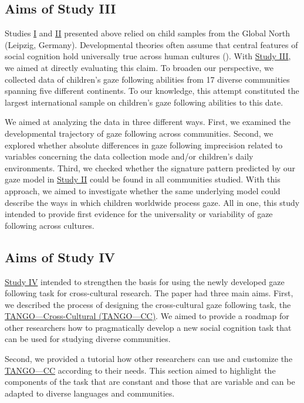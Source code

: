 \documentclass[
]{scrbook}
\begin{document}
\subsection{Aims of Study III}\label{aimsIII}

Studies \hyperref[studyI]{I} and \hyperref[studyII]{II} presented above relied on child samples from the Global North (Leipzig, Germany). Developmental theories often assume that central features of social cognition hold universally true across human cultures (). With \hyperref[studyIII]{Study III}, we aimed at directly evaluating this claim. To broaden our perspective, we collected data of children's gaze following abilities from 17 diverse communities spanning five different continents. To our knowledge, this attempt constituted the largest international sample on children's gaze following abilities to this date.

We aimed at analyzing the data in three different ways. First, we examined the developmental trajectory of gaze following across communities. Second, we explored whether absolute differences in gaze following imprecision related to variables concerning the data collection mode and/or children's daily environments. Third, we checked whether the signature pattern predicted by our gaze model in \hyperref[studyII]{Study II} could be found in all communities studied. With this approach, we aimed to investigate whether the same underlying model could describe the ways in which children worldwide process gaze. All in one, this study intended to provide first evidence for the universality or variability of gaze following across cultures.

\subsection{Aims of Study IV}\label{aimsIV}

\hyperref[studyIV]{Study IV} intended to strengthen the basis for using the newly developed gaze following task for cross-cultural research. The paper had three main aims. First, we described the process of designing the cross-cultural gaze following task, the \hyperref[acronyms_TANGOux2014CC]{TANGO---Cross-Cultural (TANGO---CC)}. We aimed to provide a roadmap for other researchers how to pragmatically develop a new social cognition task that can be used for studying diverse communities.

Second, we provided a tutorial how other researchers can use and customize the \hyperref[acronyms_TANGOux2014CC]{TANGO---CC} according to their needs. This section aimed to highlight the components of the task that are constant and those that are variable and can be adapted to diverse languages and communities.
\end{document}
